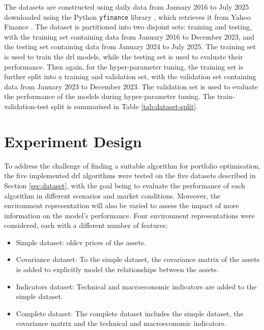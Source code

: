 The datasets are constructed using daily data from January 2016 to July 2025 downloaded using the Python \texttt{yfinance} library , which retrieves it from Yahoo Finance . The dataset is partitioned into two disjoint sets: training and testing, with the training set containing data from January 2016 to December 2023, and the testing set containing data from January 2024 to July 2025. The training set is used to train the \acrshort{drl} models, while the testing set is used to evaluate their performance. Then again, for the hyper-parameter tuning, the training set is further split into a training and validation set, with the validation set containing data from January 2023 to December 2023. The validation set is used to evaluate the performance of the models during hyper-parameter tuning. The train-validation-test split is summarised in Table \ref{tab:dataset-split}.



\section{Experiment Design} \label{sec:experiment-design}

To address the challenge of finding a suitable algorithm for portfolio optimisation, the five implemented \acrshort{drl} algorithms were tested on the five datasets described in Section \ref{sec:dataset}, with the goal being to evaluate the performance of each algorithm in different scenarios and market conditions. Moreover, the environment representation will also be varied to assess the impact of more information on the model's performance. Four environment representations were considered, each with a different number of features:
\begin{itemize}
    \item Simple dataset: \acrfull{ohlcv} prices of the assets.
    \item Covariance dataset: To the simple dataset, the covariance matrix of the assets is added to explicitly model the relationships between the assets.
    \item Indicators dataset: Technical and macroeconomic indicators are added to the simple dataset.
    \item Complete dataset: The complete dataset includes the simple dataset, the covariance matrix and the technical and macroeconomic indicators.
\end{itemize}


